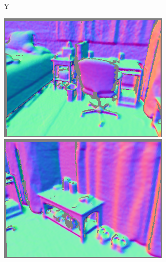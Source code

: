 \begin{figure}
\begin{minipage}{0.19\linewidth}
     \vspace{-0.05in}
     Y
    \end{minipage}
     \begin{minipage}{0.19\linewidth}
     \centering
     \includegraphics[width=\linewidth]{FrameNet/Dataset/pred-000001-normal.png}\\
     \includegraphics[width=\linewidth]{FrameNet/Dataset/pred-000003-normal.png}\\

\end{minipage}
\end{figure}
